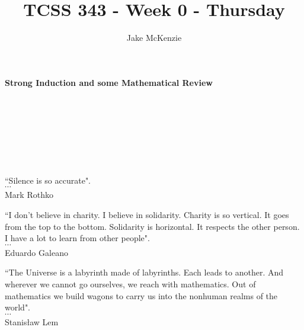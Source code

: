 \documentclass[12pt]{article}
\begin{document}
\title{TCSS 343 - Week 0 - Thursday}
\author{Jake McKenzie}
\maketitle
\noindent\centerline{\textbf{Strong Induction and some Mathematical Review}}\\\\\\\\\\\\
\begin{center}
    ``Silence is so accurate". \\$\cdots$\\ Mark Rothko
\end{center}
\begin{center}
    ``I don't believe in charity. I believe in solidarity. Charity is so vertical. It goes from the top to the bottom. Solidarity is horizontal. It respects the other person. I have a lot to learn from other people". \\$\cdots$\\ Eduardo Galeano
\end{center}
\begin{center}
    ``The Universe is a labyrinth made of labyrinths. Each leads to another. And wherever we cannot go ourselves, we reach with mathematics. Out of mathematics we build wagons to carry us into the nonhuman realms of the world". \\$\cdots$\\ Stanisław Lem
\end{center}
\newpage
\end{document}

